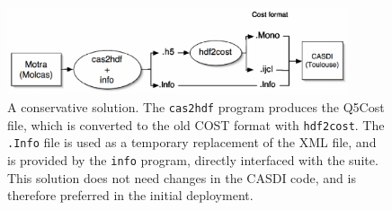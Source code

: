 \begin{center}
\begin{figure}[ht]
\begin{center}
\includegraphics[width=10cm,keepaspectratio]{04_grid/images/q5cost-intermediate-gimped.eps}
\end{center}
\caption{\footnotesize A conservative solution. The \texttt{cas2hdf}
program produces the Q5Cost file, which is converted to the old COST format with
\texttt{hdf2cost}. The \texttt{.Info} file is used as a temporary
replacement of the XML file, and is provided by the \texttt{info}
program, directly interfaced with the \molcas suite. This solution does not
need changes in the CASDI code, and is therefore preferred in the initial
deployment. }
\label{fig:q5cost-intermediate}
\end{figure}
\end{center}
